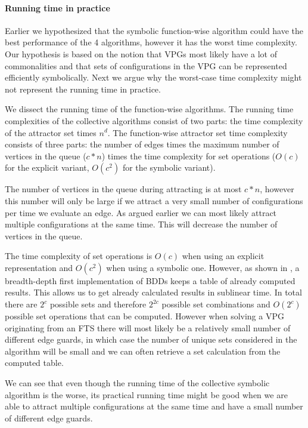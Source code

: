 \paragraph{Running time in practice}
Earlier we hypothesized that the symbolic function-wise algorithm could have the best performance of the 4 algorithms, however it has the worst time complexity. Our hypothesis is based on the notion that VPGs most likely have a lot of commonalities and that sets of configurations in the VPG can be represented efficiently symbolically. Next we argue why the worst-case time complexity might not represent the running time in practice.

We dissect the running time of the function-wise algorithms. The running time complexities of the collective algorithms consist of two parts: the time complexity of the attractor set times $n^d$. The function-wise attractor set time complexity consists of three parts: the number of edges times the maximum number of vertices in the queue ($c*n$) times the time complexity for set operations ($O(c)$ for the explicit variant, $O(c^2)$ for the symbolic variant).

The number of vertices in the queue during attracting is at most $c*n$, however this number will only be large if we attract a very small number of configurations per time we evaluate an edge. As argued earlier we can most likely attract multiple configurations at the same time. This will decrease the number of vertices in the queue.

The time complexity of set operations is $O(c)$ when using an explicit representation and $O(c^2)$ when using a symbolic one. However, as shown in \cite{BDD_running_time}, a breadth-depth first implementation of BDDs keeps a table of already computed results. This allows us to get already calculated results in sublinear time. In total there are $2^c$ possible sets and therefore $2^{2c}$ possible set combinations and $O(2^c)$ possible set operations that can be computed. However when solving a VPG originating from an FTS there will most likely be a relatively small number of different edge guards, in which case the number of unique sets considered in the algorithm will be small and we can often retrieve a set calculation from the computed table.

We can see that even though the running time of the collective symbolic algorithm is the worse, its practical running time might be good when we are able to attract multiple configurations at the same time and have a small number of different edge guards.